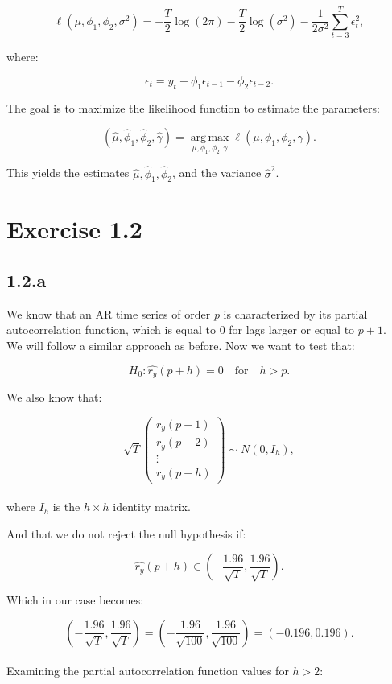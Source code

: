 \documentclass{article}
\begin{document}
\[
\ell(\mu, \phi_1, \phi_2, \sigma^2) = -\frac{T}{2} \log(2\pi) - \frac{T}{2} \log(\sigma^2) - \frac{1}{2\sigma^2} \sum_{t=3}^T \epsilon_t^2,
\]

where:

\[
\epsilon_t = y_t - \phi_1 \epsilon_{t-1} - \phi_2 \epsilon_{t-2}.
\]


The goal is to maximize the likelihood function to estimate the parameters:

\[
(\hat{\mu}, \hat{\phi}_1, \hat{\phi}_2, \hat{\gamma}) = \operatorname*{arg\,max}_{\mu, \phi_1, \phi_2, \gamma} \ell(\mu, \phi_1, \phi_2, \gamma).
\]

This yields the estimates \( \hat{\mu}, \hat{\phi}_1, \hat{\phi}_2 \), and the variance \( \hat{\sigma}^2 \).


\section*{Exercise 1.2}
\subsection*{1.2.a}

We know that an AR time series of order \( p \) is characterized by its partial autocorrelation function, which is equal to 0 for lags larger or equal to \( p + 1 \). \\

We will follow a similar approach as before. Now we want to test that:

\[
H_{0}: \hat{r_{y}}(p+h) = 0 \quad \text{for} \quad h > p.
\]

We also know that:

\[
\sqrt{T} \begin{pmatrix}
  r_y(p+1) \\
  r_y(p+2) \\
  \vdots \\
  r_y(p+h)
  \end{pmatrix} \sim N(0, I_{h}),
\]
\\
where \( I_{h} \) is the \( h \times h \) identity matrix.

And that we do not reject the null hypothesis if:

\[
  \hat{r_y}(p+h) \in \left(-\frac{1.96}{\sqrt{T}}, \frac{1.96}{\sqrt{T}} \right).
\]

Which in our case becomes:

\[
 \left(-\frac{1.96}{\sqrt{T}}, \frac{1.96}{\sqrt{T}} \right) =  \left(-\frac{1.96}{\sqrt{100}}, \frac{1.96}{\sqrt{100}} \right) = \left(-0.196, 0.196\right).
\]
\\
Examining the partial autocorrelation function values for \( h > 2 \):
\end{document}
